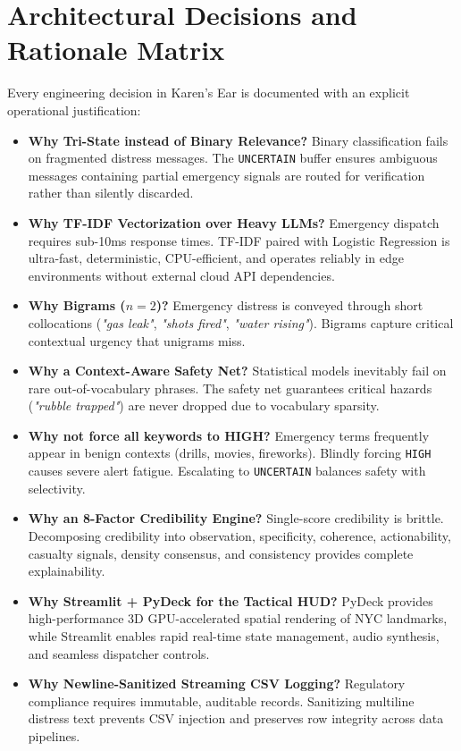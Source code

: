 \documentclass[10pt,a4paper]{article}
\begin{document}
\section{Architectural Decisions and Rationale Matrix}
Every engineering decision in Karen's Ear is documented with an explicit operational justification:
\begin{itemize}
  \item \textbf{Why Tri-State instead of Binary Relevance?} Binary classification fails on fragmented distress messages. The \texttt{UNCERTAIN} buffer ensures ambiguous messages containing partial emergency signals are routed for verification rather than silently discarded.
  \item \textbf{Why TF-IDF Vectorization over Heavy LLMs?} Emergency dispatch requires sub-10ms response times. TF-IDF paired with Logistic Regression is ultra-fast, deterministic, CPU-efficient, and operates reliably in edge environments without external cloud API dependencies.
  \item \textbf{Why Bigrams ($n=2$)?} Emergency distress is conveyed through short collocations (\emph{"gas leak"}, \emph{"shots fired"}, \emph{"water rising"}). Bigrams capture critical contextual urgency that unigrams miss.
  \item \textbf{Why a Context-Aware Safety Net?} Statistical models inevitably fail on rare out-of-vocabulary phrases. The safety net guarantees critical hazards (\emph{"rubble trapped"}) are never dropped due to vocabulary sparsity.
  \item \textbf{Why not force all keywords to HIGH?} Emergency terms frequently appear in benign contexts (drills, movies, fireworks). Blindly forcing \texttt{HIGH} causes severe alert fatigue. Escalating to \texttt{UNCERTAIN} balances safety with selectivity.
  \item \textbf{Why an 8-Factor Credibility Engine?} Single-score credibility is brittle. Decomposing credibility into observation, specificity, coherence, actionability, casualty signals, density consensus, and consistency provides complete explainability.
  \item \textbf{Why Streamlit + PyDeck for the Tactical HUD?} PyDeck provides high-performance 3D GPU-accelerated spatial rendering of NYC landmarks, while Streamlit enables rapid real-time state management, audio synthesis, and seamless dispatcher controls.
  \item \textbf{Why Newline-Sanitized Streaming CSV Logging?} Regulatory compliance requires immutable, auditable records. Sanitizing multiline distress text prevents CSV injection and preserves row integrity across data pipelines.
\end{itemize}
\end{document}
